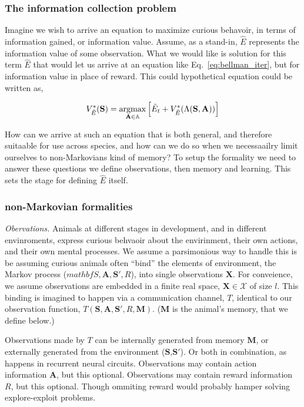 \subsubsection*{The information collection problem}
Imagine we wish to arrive an equation to maximize curious behavoir, in terms of information gained, or information value. Assume, as a stand-in, $\hat E$ represents the information value of some observation. What we would like is solution for this term $\hat E$ that would let us arrive at an equation like Eq.~\ref{eq:bellman_iter}, but for information value in place of reward. This could hypothetical equation could be written as, 

\begin{equation} 
	\label{eq:bellman_iter_E}
	V^*_{\hat E}(\mathbf{S}) = \operatorname*{argmax}_{\mathbf{A} \in \mathbb{A}} \Big [ \hat E_{t}  + V^*_{\hat E}(\Lambda(\mathbf{S},\mathbf{A})) \Big ]
\end{equation}

How can we arrive at such an equation that is both general, and therefore suitaable for use across species, and how can we do so when we necessaailry limit ourselves to non-Markovians kind of memory? To setup the formality we need to answer these questions we define observations, then memory and learning. This sets the stage for defining $\hat E$ itself.

\subsubsection*{non-Markovian formalities}
\emph{Obervations.} Animals at different stages in development, and in different envinroments, express curious behvaoir about the envirinment, their own actions, and their own mental processes. We assume a parsimonious way to handle this is be assuming curious animals often ``bind'' \cite{Robertson2003} the elements of environment, the Markov process ($mathbf{S},\mathbf{A},\mathbf{S'},R$), into single observations $\mathbf{X}$. For conveience, we assume observations are embedded in a finite real space, $\mathbf{X} \in \mathcal{X}$ of size $l$. This binding is imagined to happen via a communication channel, $T$, identical to our observation function, $T(\mathbf{S},\mathbf{A},\mathbf{S'},R,\mathbf{M})$. ($\mathbf{M}$ is the animal's memory, that we define below.)

Observations made by $T$ can be internally generated from memory $\mathbf{M}$, or externally generated from the environment ($\mathbf{S}$,$\mathbf{S'}$). Or both in combination, as happens in recurrent neural circuits. Observations may contain action information $\mathbf{A}$, but this optional. Observations may contain reward information $R$, but this optional. Though ommiting reward would probably hamper solving explore-exploit problems. 

